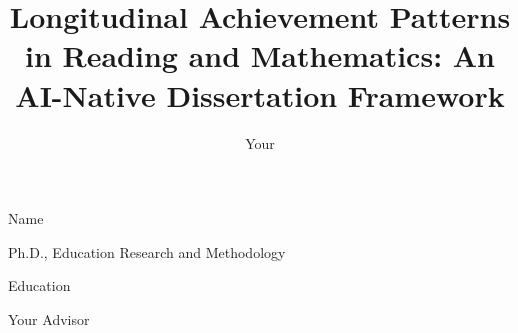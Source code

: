 

\title{Longitudinal Achievement Patterns in Reading and Mathematics: An AI-Native Dissertation Framework}

\author{Your}{Name}


       {Ph.D., Education Research and Methodology}

     {Education}

        {Your Advisor}



